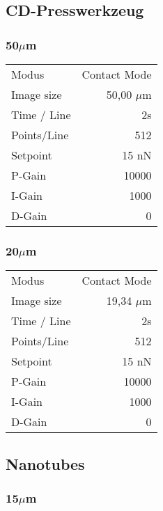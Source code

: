 \subsection{CD-Presswerkzeug}
\subsubsection{50$\mu$m}
\begin{center}
    \centering
    \begin{tabular}{l|r}
        Modus & Contact Mode\\
        Image size & 50,00 $\mu$m \\
        Time / Line & 2s \\
        Points/Line & 512\\
        Setpoint & 15 nN \\
        P-Gain & 10000 \\
        I-Gain & 1000 \\
        D-Gain & 0 \\
        
    \end{tabular}
\end{center}

\subsubsection{20$\mu$m}

\begin{center}
    \centering
    \begin{tabular}{l|r}
        Modus & Contact Mode\\
        Image size & 19,34 $\mu$m \\
        Time / Line & 2s \\
        Points/Line & 512\\
        Setpoint & 15 nN \\
        P-Gain & 10000 \\
        I-Gain & 1000 \\
        D-Gain & 0 \\
        
    \end{tabular}
\end{center}

\subsection{Nanotubes}
\subsubsection{15$\mu$m}

